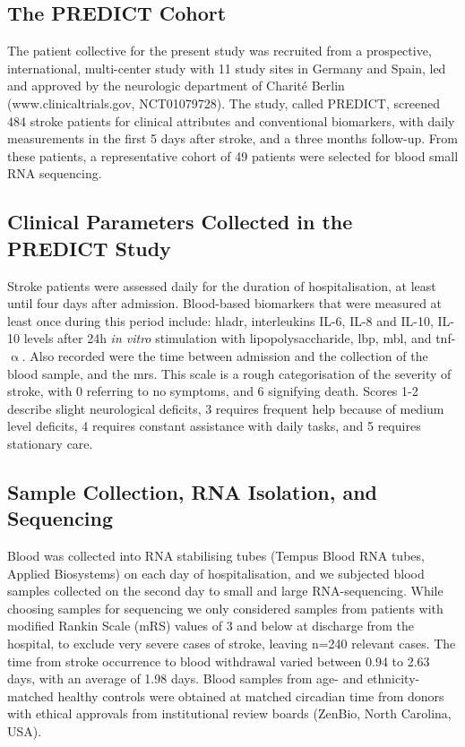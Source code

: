 \begin{method}

\subsection{The PREDICT Cohort}
The patient collective for the present study was recruited from a prospective, international, multi-center study with 11 study sites in Germany and Spain, led and approved by the neurologic department of Charité Berlin (www.clinicaltrials.gov, NCT01079728).\cite{Hoffmann2017} The study, called PREDICT, screened 484 stroke patients for clinical attributes and conventional biomarkers, with daily measurements in the first 5 days after stroke, and a three months follow-up. From these patients, a representative cohort of 49 patients were selected for blood small RNA sequencing. 

\subsection{Clinical Parameters Collected in the PREDICT Study}
Stroke patients were assessed daily for the duration of hospitalisation, at least until four days after admission. Blood-based biomarkers that were measured at least once during this period include: \ac{hladr}, interleukins IL-6, IL-8 and IL-10, IL-10 levels after 24h \emph{in vitro} stimulation with lipopolysaccharide, \ac{lbp}, \ac{mbl}, and \ac{tnf}-$\upalpha$. Also recorded were the time between admission and the collection of the blood sample, and the \ac{mrs}. This scale is a rough categorisation of the severity of stroke, with 0 referring to no symptoms, and 6 signifying death. Scores 1-2 describe slight neurological deficits, 3 requires frequent help because of medium level deficits, 4 requires constant assistance with daily tasks, and 5 requires stationary care.

\subsection{Sample Collection, RNA Isolation, and Sequencing}
Blood was collected into RNA stabilising tubes (Tempus Blood RNA tubes, Applied Biosystems) on each day of hospitalisation, and we subjected blood samples collected on the second day to small and large RNA-sequencing. While choosing samples for sequencing we only considered samples from patients with modified Rankin Scale (mRS) values of 3 and below at discharge from the hospital, to exclude very severe cases of stroke, leaving n=240 relevant cases. The time from stroke occurrence to blood withdrawal varied between 0.94 to 2.63 days, with an average of 1.98 days. Blood samples from age- and ethnicity-matched healthy controls were obtained at matched circadian time from donors with ethical approvals from institutional review boards (ZenBio, North Carolina, USA).


\end{method}
